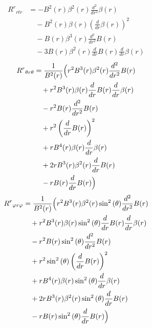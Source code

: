 \documentclass[11pt,a4paper]{article}
\newcommand{\riemann}[4]{R^{#1}{}_{#2 #3 #4}}
\begin{document}
\begin{align*}
  \riemann{r}{r}{t}{r} &= - B^{2}{\left(r \right)} \beta^{2}{\left(r \right)} \frac{d^{2}}{d r^{2}} \beta{\left(r \right)} \\
  &\quad - B^{2}{\left(r \right)} \beta{\left(r \right)} \left(\frac{d}{d r} \beta{\left(r \right)}\right)^{2} \\
  &\quad - B{\left(r \right)} \beta^{3}{\left(r \right)} \frac{d^{2}}{d r^{2}} B{\left(r \right)} \\
  &\quad - 3 B{\left(r \right)} \beta^{2}{\left(r \right)} \frac{d}{d r} B{\left(r \right)} \frac{d}{d r} \beta{\left(r \right)}
\end{align*}
\begin{align*}
  \riemann{r}{\theta}{r}{\theta} &= \frac{1}{B^{2}{\left(r \right)}}\Bigl(r^{2} B^{3}{\left(r \right)} \beta^{2}{\left(r \right)} \frac{d^{2}}{d r^{2}} B{\left(r \right)} \\
  &\quad + r^{2} B^{3}{\left(r \right)} \beta{\left(r \right)} \frac{d}{d r} B{\left(r \right)} \frac{d}{d r} \beta{\left(r \right)} \\
  &\quad - r^{2} B{\left(r \right)} \frac{d^{2}}{d r^{2}} B{\left(r \right)} \\
  &\quad + r^{2} \left(\frac{d}{d r} B{\left(r \right)}\right)^{2} \\
  &\quad + r B^{4}{\left(r \right)} \beta{\left(r \right)} \frac{d}{d r} \beta{\left(r \right)} \\
  &\quad + 2 r B^{3}{\left(r \right)} \beta^{2}{\left(r \right)} \frac{d}{d r} B{\left(r \right)} \\
  &\quad - r B{\left(r \right)} \frac{d}{d r} B{\left(r \right)}\Bigr)
\end{align*}
\begin{align*}
  \riemann{r}{\varphi}{r}{\varphi} &= \frac{1}{B^{2}{\left(r \right)}}\Bigl(r^{2} B^{3}{\left(r \right)} \beta^{2}{\left(r \right)} \sin^{2}{\left(\theta \right)} \frac{d^{2}}{d r^{2}} B{\left(r \right)} \\
  &\quad + r^{2} B^{3}{\left(r \right)} \beta{\left(r \right)} \sin^{2}{\left(\theta \right)} \frac{d}{d r} B{\left(r \right)} \frac{d}{d r} \beta{\left(r \right)} \\
  &\quad - r^{2} B{\left(r \right)} \sin^{2}{\left(\theta \right)} \frac{d^{2}}{d r^{2}} B{\left(r \right)} \\
  &\quad + r^{2} \sin^{2}{\left(\theta \right)} \left(\frac{d}{d r} B{\left(r \right)}\right)^{2} \\
  &\quad + r B^{4}{\left(r \right)} \beta{\left(r \right)} \sin^{2}{\left(\theta \right)} \frac{d}{d r} \beta{\left(r \right)} \\
  &\quad + 2 r B^{3}{\left(r \right)} \beta^{2}{\left(r \right)} \sin^{2}{\left(\theta \right)} \frac{d}{d r} B{\left(r \right)} \\
  &\quad - r B{\left(r \right)} \sin^{2}{\left(\theta \right)} \frac{d}{d r} B{\left(r \right)}\Bigr)
\end{align*}
\end{document}
